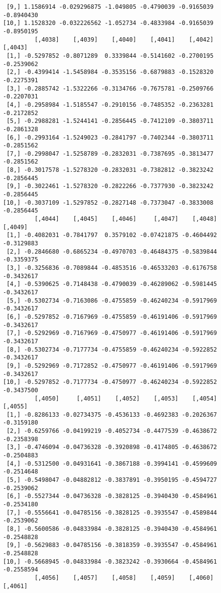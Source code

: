 \documentclass[
  letterpaper,
  DIV=11,
  numbers=noendperiod]{scrreprt}
\begin{document}
\begin{verbatim}
 [9,] 1.1586914 -0.029296875 -1.049805 -0.4790039 -0.9165039 -0.8940430
[10,] 1.1528320 -0.032226562 -1.052734 -0.4833984 -0.9165039 -0.8950195
         [,4038]    [,4039]    [,4040]    [,4041]    [,4042]    [,4043]
 [1,] -0.5297852 -0.8071289  0.3339844 -0.5141602 -0.2700195 -0.2539062
 [2,] -0.4399414 -1.5458984 -0.3535156 -0.6879883 -0.1528320 -0.2275391
 [3,] -0.2885742 -1.5322266 -0.3134766 -0.7675781 -0.2509766 -0.2207031
 [4,] -0.2958984 -1.5185547 -0.2910156 -0.7485352 -0.2363281 -0.2172852
 [5,] -0.2988281 -1.5244141 -0.2856445 -0.7412109 -0.3803711 -0.2861328
 [6,] -0.2993164 -1.5249023 -0.2841797 -0.7402344 -0.3803711 -0.2851562
 [7,] -0.2998047 -1.5258789 -0.2832031 -0.7387695 -0.3813477 -0.2851562
 [8,] -0.3017578 -1.5278320 -0.2832031 -0.7382812 -0.3823242 -0.2856445
 [9,] -0.3022461 -1.5278320 -0.2822266 -0.7377930 -0.3823242 -0.2856445
[10,] -0.3037109 -1.5297852 -0.2827148 -0.7373047 -0.3833008 -0.2856445
         [,4044]    [,4045]    [,4046]     [,4047]    [,4048]    [,4049]
 [1,] -0.4082031 -0.7841797  0.3579102 -0.07421875 -0.4604492 -0.3129883
 [2,] -0.2846680 -0.6865234 -0.4970703 -0.46484375 -0.5839844 -0.3359375
 [3,] -0.3256836 -0.7089844 -0.4853516 -0.46533203 -0.6176758 -0.3432617
 [4,] -0.5390625 -0.7148438 -0.4790039 -0.46289062 -0.5981445 -0.3432617
 [5,] -0.5302734 -0.7163086 -0.4755859 -0.46240234 -0.5917969 -0.3432617
 [6,] -0.5297852 -0.7167969 -0.4755859 -0.46191406 -0.5917969 -0.3432617
 [7,] -0.5292969 -0.7167969 -0.4750977 -0.46191406 -0.5917969 -0.3432617
 [8,] -0.5302734 -0.7177734 -0.4755859 -0.46240234 -0.5922852 -0.3432617
 [9,] -0.5292969 -0.7172852 -0.4750977 -0.46191406 -0.5917969 -0.3432617
[10,] -0.5297852 -0.7177734 -0.4750977 -0.46240234 -0.5922852 -0.3437500
         [,4050]     [,4051]    [,4052]    [,4053]    [,4054]    [,4055]
 [1,] -0.8286133 -0.02734375 -0.4536133 -0.4692383 -0.2026367 -0.3159180
 [2,] -0.6259766 -0.04199219 -0.4052734 -0.4477539 -0.4638672 -0.2358398
 [3,] -0.4746094 -0.04736328 -0.3920898 -0.4174805 -0.4638672 -0.2504883
 [4,] -0.5312500 -0.04931641 -0.3867188 -0.3994141 -0.4599609 -0.2514648
 [5,] -0.5498047 -0.04882812 -0.3837891 -0.3950195 -0.4594727 -0.2539062
 [6,] -0.5527344 -0.04736328 -0.3828125 -0.3940430 -0.4584961 -0.2534180
 [7,] -0.5556641 -0.04785156 -0.3828125 -0.3935547 -0.4589844 -0.2539062
 [8,] -0.5600586 -0.04833984 -0.3828125 -0.3940430 -0.4584961 -0.2548828
 [9,] -0.5629883 -0.04785156 -0.3818359 -0.3935547 -0.4584961 -0.2548828
[10,] -0.5668945 -0.04833984 -0.3823242 -0.3930664 -0.4584961 -0.2558594
         [,4056]    [,4057]    [,4058]    [,4059]    [,4060]    [,4061]

\end{verbatim}
\end{document}

